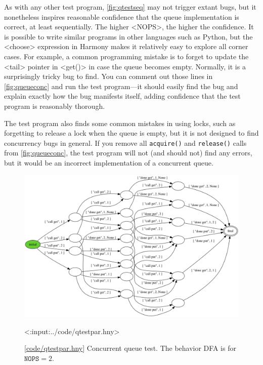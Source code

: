 \documentclass{report}
\newcommand{\harmonylink}[1]{%
[\href{https://harmony.cs.cornell.edu/#1}{\underline{#1}}]%
}
\newenvironment{code}{
\tcolorbox
}{
\endtcolorbox
}
\begin{document}

As with any other test program,
\autoref{fig:qtestseq} may not trigger extant bugs, but
it nonetheless inspires reasonable confidence that the
queue implementation is correct, at least sequentially.
The higher <{NOPS}>, the higher the confidence.
It is possible to write similar programs in other languages
such as Python, but the <{choose}> expression in Harmony
makes it relatively easy to explore all corner cases.
%
For example, a common programming mistake is to forget to
update the <{tail}> pointer in <{get()}> in case
the queue becomes empty.  Normally, it is a surprisingly
tricky bug to find.  You can comment out those lines
in \autoref{fig:queueconc} and run the test program---it should
easily find the bug and explain exactly how
the bug manifests itself, adding confidence that the test program
is reasonably thorough.

The test program also finds some common mistakes in using
locks, such as forgetting to release a lock when the queue
is empty, but it is not designed to find concurrency bugs
in general.  If you remove all \texttt{acquire()} and
\texttt{release()} calls from \autoref{fig:queueconc},
the test program will not (and should not)
find any errors, but it would be an incorrect implementation
of a concurrent queue.

\begin{figure}
\begin{center}
\includegraphics[width=\textwidth]{figures/qtestpar.png}
\end{center}
\begin{code}
<{:input:../code/qtestpar.hny}>
\end{code}
\caption{\harmonylink{code/qtestpar.hny} Concurrent queue test.  The
behavior DFA is for $\mathtt{NOPS} = 2$.}
\label{fig:qtestpar}
\end{figure}
\end{document}
